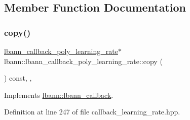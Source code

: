 \subsection{Member Function Documentation}
\mbox{\label{classlbann_1_1lbann__callback__poly__learning__rate_aea01c416903c421cf6dce1a7f320c94b}} 
\subsubsection{\texorpdfstring{copy()}{copy()}}
{\footnotesize\ttfamily \hyperlink{classlbann_1_1lbann__callback__poly__learning__rate}{lbann\+\_\+callback\+\_\+poly\+\_\+learning\+\_\+rate}$\ast$ lbann\+::lbann\+\_\+callback\+\_\+poly\+\_\+learning\+\_\+rate\+::copy (\begin{DoxyParamCaption}{ }\end{DoxyParamCaption}) const\hspace{0.3cm}{\ttfamily [inline]}, {\ttfamily [override]}, {\ttfamily [virtual]}}



Implements \hyperlink{classlbann_1_1lbann__callback_a9f545d1269a8c7af335625d049691f26}{lbann\+::lbann\+\_\+callback}.



Definition at line 247 of file callback\+\_\+learning\+\_\+rate.\+hpp.


